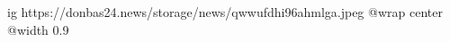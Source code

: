  
 
 
 
 

\ifcmt
  ig https://donbas24.news/storage/news/qwwufdhi96ahmlga.jpeg
  @wrap center
  @width 0.9
\fi
